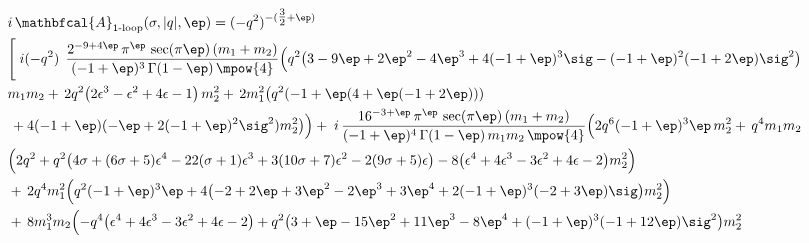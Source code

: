 \endgroup
\begin{tcolorbox}[thesisresultbox, title=\textit{Full one loop amplitude in small $|q|$ expansion}, boxsep=0.5mm, left=0.5mm, right=0.5mm, top=0.5mm, bottom=0.5mm]
\restorethesisbodyformat
\begingroup
\footnotesize
\setlength{\jot}{2pt}
\setlength{\abovedisplayskip}{4pt}
\setlength{\belowdisplayskip}{4pt}
\setlength{\abovedisplayshortskip}{2pt}
\setlength{\belowdisplayshortskip}{2pt}
\allowdisplaybreaks[4]
\begin{align*}
&\hspace{0cm}i\,\mathbfcal{A}_{\text{1-loop}}(\sigma,|q|,\ep)
= {} (-q^2)^{-(\tfrac32+\ep)}\;\\ & 
\hspace{0cm}\Biggl[
\;i(-q^2)\;
 \,\frac{2^{-9+4\ep}\,\pi^{\ep}\,\sec(\pi\ep)\,(m_1+m_2)}
             {(-1+\ep)^{3}\,\Gamma(1-\ep)\,\mpow{4}}
\Bigl(
      q^2\bigl(3-9\ep+2\ep^{2}-4\ep^{3}+4(-1+\ep)^{3}\sig-(-1+\ep)^{2}(-1+2\ep)\sig^{2}\bigr)
\\
&\hspace{0cm}
   m_1 m_2 +\,2 q^2\bigl(2 \epsilon ^3-\epsilon ^2+4 \epsilon -1\bigr)\,m_2^{2}
    +\,2 m_1^{2}\bigl(q^2(-1+\ep(4+\ep(-1+2\ep))) 
\\&\hspace{0cm} \,+ 4(-1+\ep)(-\ep+2(-1+\ep)^{2}\sig^{2})m_2^{2}\bigr)
\Bigr)+\; 
 i\,\frac{16^{-3+\ep}\,\pi^{\ep}\,\sec(\pi\ep)\,(m_1+m_2)}
             {(-1+\ep)^{4}\,\Gamma(1-\ep)\,m_1 m_2\,\mpow{4}}
\Bigl(
   2 q^{6}(-1+\ep)^{3}\ep\,m_2^{2} +\, q^{4} m_1 m_2
\\
&\hspace{0cm}
  \Bigl( 2 q^{2} + q^{2}\bigl(4 \sigma +(6 \sigma +5) \epsilon ^4-22 (\sigma +1) \epsilon ^3+3 (10 \sigma +7) \epsilon ^2-2 (9 \sigma +5) \epsilon\bigr)
   - 8\bigl(\epsilon ^4+4 \epsilon ^3-3 \epsilon ^2+4 \epsilon -2\bigr)m_2^{2}\Bigr)
\\
&\hspace{0cm}
 +\,2 q^{4} m_1^{2}\Bigl(q^{2}(-1+\ep)^{3}\ep
   + 4\bigl(-2+2\ep+3\ep^{2}-2\ep^{3}+3\ep^{4}+2(-1+\ep)^{3}(-2+3\ep)\sig\bigr)m_2^{2}\Bigr)
\\
&\hspace{0cm}
 +\,8 m_1^{3} m_2\Bigl(
     -q^{4}\bigl(\epsilon ^4+4 \epsilon ^3-3 \epsilon ^2+4 \epsilon -2\bigr)
     + q^{2}\bigl(3+\ep-15\ep^{2}+11\ep^{3}-8\ep^{4}+(-1+\ep)^{3}(-1+12\ep)\sig^{2}\bigr)m_2^{2}

\end{align*}
\end{tcolorbox}
